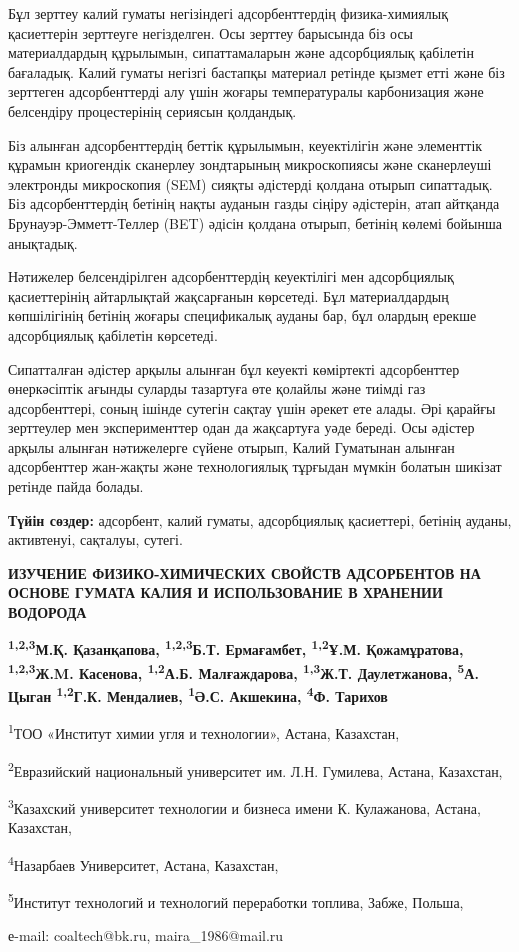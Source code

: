 Бұл зерттеу калий гуматы негізіндегі адсорбенттердің физика-химиялық
қасиеттерін зерттеуге негізделген. Осы зерттеу барысында біз осы
материалдардың құрылымын, сипаттамаларын және адсорбциялық қабілетін
бағаладық. Калий гуматы негізгі бастапқы материал ретінде қызмет етті
және біз зерттеген адсорбенттерді алу үшін жоғары температуралы
карбонизация және белсендіру процестерінің сериясын қолдандық.

Біз алынған адсорбенттердің беттік құрылымын, кеуектілігін және
элементтік құрамын криогендік сканерлеу зондтарының микроскопиясы және
сканерлеуші электронды микроскопия (SEM) сияқты әдістерді қолдана отырып
сипаттадық. Біз адсорбенттердің бетінің нақты ауданын газды сіңіру
әдістерін, атап айтқанда Брунауэр-Эмметт-Теллер (BET) әдісін қолдана
отырып, бетінің көлемі бойынша анықтадық.

Нәтижелер белсендірілген адсорбенттердің кеуектілігі мен адсорбциялық
қасиеттерінің айтарлықтай жақсарғанын көрсетеді. Бұл материалдардың
көпшілігінің бетінің жоғары спецификалық ауданы бар, бұл олардың ерекше
адсорбциялық қабілетін көрсетеді.

Сипатталған әдістер арқылы алынған бұл кеуекті көміртекті адсорбенттер
өнеркәсіптік ағынды суларды тазартуға өте қолайлы және тиімді газ
адсорбенттері, соның ішінде сутегін сақтау үшін әрекет ете алады. Әрі
қарайғы зерттеулер мен эксперименттер одан да жақсартуға уәде береді.
Осы әдістер арқылы алынған нәтижелерге сүйене отырып, Калий Гуматынан
алынған адсорбенттер жан-жақты және технологиялық тұрғыдан мүмкін
болатын шикізат ретінде пайда болады.

{\bfseries Түйін сөздер:} адсорбент, калий гуматы, адсорбциялық қасиеттері,
бетінің ауданы, активтенуі, сақталуы, сутегі.

\begin{articleheader}
{\bfseries ИЗУЧЕНИЕ ФИЗИКО-ХИМИЧЕСКИХ СВОЙСТВ АДСОРБЕНТОВ НА ОСНОВЕ ГУМАТА КАЛИЯ И ИСПОЛЬЗОВАНИЕ В ХРАНЕНИИ ВОДОРОДА}

{\bfseries
\textsuperscript{1,2,3}М.Қ. Қазанқапова\textsuperscript{\envelope },
\textsuperscript{1,2,3}Б.Т. Ермағамбет,
\textsuperscript{1,2}Ұ.М. Қожамұратова,
\textsuperscript{1,2,3}Ж.M. Касенова,
\textsuperscript{1,2}А.Б. Малғаждарова,
\textsuperscript{1,3}Ж.Т. Даулетжанова,
\textsuperscript{5}А. Цыган
\textsuperscript{1,2}Г.К. Мендалиев,
\textsuperscript{1}Ә.С. Акшекина,
\textsuperscript{4}Ф. Тарихов
}
\end{articleheader}

\begin{affiliation}
\textsuperscript{1}ТОО «Институт химии угля и технологии», Астана, Казахстан,

\textsuperscript{2}Евразийский национальный университет им. Л.Н. Гумилева, Астана, Казахстан,

\textsuperscript{3}Казахский университет технологии и бизнеса имени К. Кулажанова, Астана, Казахстан,

\textsuperscript{4}Назарбаев Университет, Астана, Казахстан,

\textsuperscript{5}Институт технологий и технологий переработки топлива, Забже, Польша,

е-mail: coaltech@bk.ru, maira\_1986@mail.ru
\end{affiliation}

